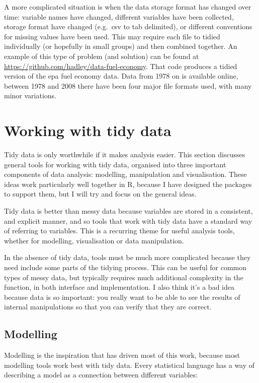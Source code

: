 \documentclass[oneside]{article}
\begin{document}
A more complicated situation is when the data storage format has changed over time: variable names have changed, different variables have been collected, storage format have changed (e.g.\ csv to tab delimited), or different conventions for missing values have been used. This may require each file to tidied individually (or hopefully in small groups) and then combined together. An example of this type of problem (and solution) can be found at \url{https://github.com/hadley/data-fuel-economy}. That code produces a tidied version of the {\sc epa} fuel economy data. Data from 1978 on is available online, between 1978 and 2008 there have been four major file formats used, with many minor variations.

\section{Working with tidy data}

Tidy data is only worthwhile if it makes analysis easier. This section discusses general tools for working with tidy data, organised into three important components of data analysis: modelling, manipulation and visualisation. These ideas work particularly well together in R, because I have designed the packages to support them, but I will try and focus on the general ideas.

Tidy data is better than messy data because variables are stored in a consistent, and explicit manner, and so tools that work with tidy data have a standard way of referring to variables.  This is a recurring theme for useful analysis tools, whether for modelling, visualisation or data manipulation.

In the absence of tidy data, tools must be much more complicated because they need include some parts of the tidying process. This can be useful for common types of messy data, but typically requires much additional complexity in the function, in both interface and implementation. I also think it's a bad idea because data is so important: you really want to be able to see the results of internal manipulations so that you can verify that they are correct. 

\subsection{Modelling}

Modelling is the inspiration that has driven most of this work, because most modelling tools work best with tidy data. Every statistical language has a way of describing a model as a connection between different variables:   
\end{document}
